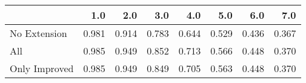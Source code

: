 \begin{tabular}{lrrrrrrr}
\toprule
{} &   1.0 &   2.0 &   3.0 &   4.0 &   5.0 &   6.0 &   7.0 \\
\midrule
No Extension  & 0.981 & 0.914 & 0.783 & 0.644 & 0.529 & 0.436 & 0.367 \\
All           & 0.985 & 0.949 & 0.852 & 0.713 & 0.566 & 0.448 & 0.370 \\
Only Improved & 0.985 & 0.949 & 0.849 & 0.705 & 0.563 & 0.448 & 0.370 \\
\bottomrule
\end{tabular}
